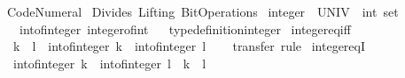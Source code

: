 %
\begin{isabellebody}%
%
%
\isadelimdocument
%
\endisadelimdocument
%
\isatagdocument
%
\isamarkuptrue%
%
\endisatagdocument
{\isafolddocument}%
%
\isadelimdocument
%
\endisadelimdocument
%
\isadelimtheory
%
\endisadelimtheory
%
\isatagtheory
{}\isamarkupfalse%
\ Code{\isacharunderscore}{\kern0pt}Numeral\isanewline
{}\ Divides\ Lifting\ Bit{\isacharunderscore}{\kern0pt}Operations\isanewline
{}%
\endisatagtheory
{\isafoldtheory}%
%
\isadelimtheory
%
\endisadelimtheory
%
\isadelimdocument
%
\endisadelimdocument
%
\isatagdocument
%
\isamarkuptrue%
%
\endisatagdocument
{\isafolddocument}%
%
\isadelimdocument
%
\endisadelimdocument
{}\isamarkupfalse%
\ integer\ {\isacharequal}{\kern0pt}\ {\isachardoublequoteopen}UNIV\ {\isacharcolon}{\kern0pt}{\isacharcolon}{\kern0pt}\ int\ set{\isachardoublequoteclose}\isanewline
\ \ \ int{\isacharunderscore}{\kern0pt}of{\isacharunderscore}{\kern0pt}integer\ integer{\isacharunderscore}{\kern0pt}of{\isacharunderscore}{\kern0pt}int%
\isadelimproof
\ %
\endisadelimproof
%
\isatagproof
\isacommand{{\isachardot}{\kern0pt}{\isachardot}{\kern0pt}}\isamarkupfalse%
%
\endisatagproof
{\isafoldproof}%
%
\isadelimproof
%
\endisadelimproof
\isanewline
\isanewline
{}\isamarkupfalse%
\ type{\isacharunderscore}{\kern0pt}definition{\isacharunderscore}{\kern0pt}integer\isanewline
\isanewline
{}\isamarkupfalse%
\ integer{\isacharunderscore}{\kern0pt}eq{\isacharunderscore}{\kern0pt}iff{\isacharcolon}{\kern0pt}\isanewline
\ \ {\isachardoublequoteopen}k\ {\isacharequal}{\kern0pt}\ l\ {\isasymlongleftrightarrow}\ int{\isacharunderscore}{\kern0pt}of{\isacharunderscore}{\kern0pt}integer\ k\ {\isacharequal}{\kern0pt}\ int{\isacharunderscore}{\kern0pt}of{\isacharunderscore}{\kern0pt}integer\ l{\isachardoublequoteclose}\isanewline
%
\isadelimproof
\ \ %
\endisadelimproof
%
\isatagproof
{}\isamarkupfalse%
\ transfer\ rule%
\endisatagproof
{\isafoldproof}%
%
\isadelimproof
\isanewline
%
\endisadelimproof
\isanewline
{}\isamarkupfalse%
\ integer{\isacharunderscore}{\kern0pt}eqI{\isacharcolon}{\kern0pt}\isanewline
\ \ {\isachardoublequoteopen}int{\isacharunderscore}{\kern0pt}of{\isacharunderscore}{\kern0pt}integer\ k\ {\isacharequal}{\kern0pt}\ int{\isacharunderscore}{\kern0pt}of{\isacharunderscore}{\kern0pt}integer\ l\ {\isasymLongrightarrow}\ k\ {\isacharequal}{\kern0pt}\ l{\isachardoublequoteclose}\isanewline

\end{isabellebody}
